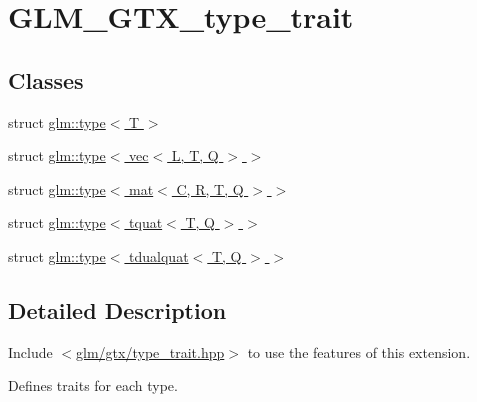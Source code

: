 \hypertarget{group__gtx__type__trait}{}\section{G\+L\+M\+\_\+\+G\+T\+X\+\_\+type\+\_\+trait}
\label{group__gtx__type__trait}
\subsection*{Classes}
\begin{DoxyCompactItemize}
\item 
struct \hyperlink{structglm_1_1type}{glm\+::type$<$ T $>$}
\item 
struct \hyperlink{structglm_1_1type_3_01vec_3_01_l_00_01_t_00_01_q_01_4_01_4}{glm\+::type$<$ vec$<$ L, T, Q $>$ $>$}
\item 
struct \hyperlink{structglm_1_1type_3_01mat_3_01_c_00_01_r_00_01_t_00_01_q_01_4_01_4}{glm\+::type$<$ mat$<$ C, R, T, Q $>$ $>$}
\item 
struct \hyperlink{structglm_1_1type_3_01tquat_3_01_t_00_01_q_01_4_01_4}{glm\+::type$<$ tquat$<$ T, Q $>$ $>$}
\item 
struct \hyperlink{structglm_1_1type_3_01tdualquat_3_01_t_00_01_q_01_4_01_4}{glm\+::type$<$ tdualquat$<$ T, Q $>$ $>$}
\end{DoxyCompactItemize}


\subsection{Detailed Description}
Include $<$\hyperlink{type__trait_8hpp}{glm/gtx/type\+\_\+trait.\+hpp}$>$ to use the features of this extension.

Defines traits for each type. 